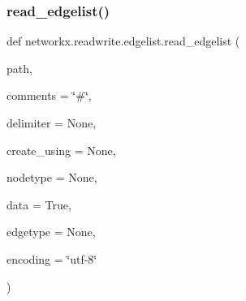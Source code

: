\subsubsection{\texorpdfstring{read\+\_\+edgelist()}{read\_edgelist()}}
{\footnotesize\ttfamily def networkx.\+readwrite.\+edgelist.\+read\+\_\+edgelist (\begin{DoxyParamCaption}\item[{}]{path,  }\item[{}]{comments = {\ttfamily \char`\"{}\#\char`\"{}},  }\item[{}]{delimiter = {\ttfamily None},  }\item[{}]{create\+\_\+using = {\ttfamily None},  }\item[{}]{nodetype = {\ttfamily None},  }\item[{}]{data = {\ttfamily True},  }\item[{}]{edgetype = {\ttfamily None},  }\item[{}]{encoding = {\ttfamily \char`\"{}utf-\/8\char`\"{}} }\end{DoxyParamCaption})}

